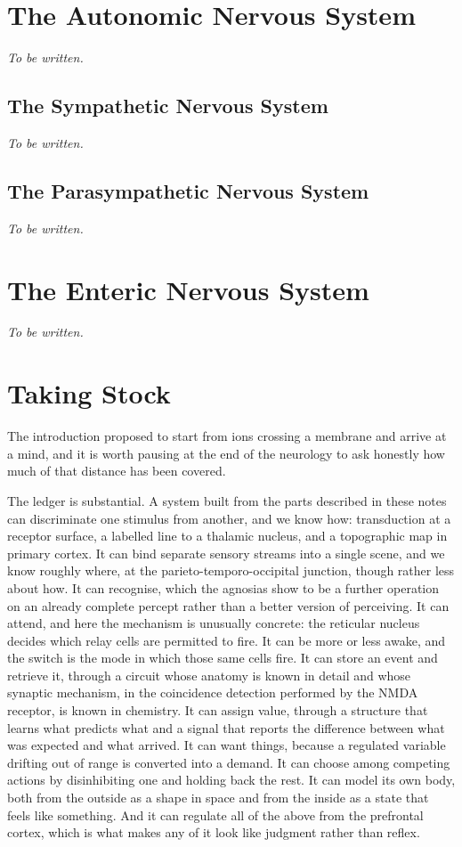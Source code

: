 \documentclass[11pt]{article}
\newcommand{\tobewritten}{\noindent\textit{To be written.}}
\begin{document}
\section{The Autonomic Nervous System}

\tobewritten

\subsection{The Sympathetic Nervous System}

\tobewritten

\subsection{The Parasympathetic Nervous System}

\tobewritten


\section{The Enteric Nervous System}

\tobewritten


\section*{Taking Stock}

The introduction proposed to start from ions crossing a membrane and arrive at a mind, and it is worth pausing at the end of the neurology to ask honestly how much of that distance has been covered.

The ledger is substantial. A system built from the parts described in these notes can discriminate one stimulus from another, and we know how: transduction at a receptor surface, a labelled line to a thalamic nucleus, and a topographic map in primary cortex. It can bind separate sensory streams into a single scene, and we know roughly where, at the parieto-temporo-occipital junction, though rather less about how. It can recognise, which the agnosias show to be a further operation on an already complete percept rather than a better version of perceiving. It can attend, and here the mechanism is unusually concrete: the reticular nucleus decides which relay cells are permitted to fire. It can be more or less awake, and the switch is the mode in which those same cells fire. It can store an event and retrieve it, through a circuit whose anatomy is known in detail and whose synaptic mechanism, in the coincidence detection performed by the NMDA receptor, is known in chemistry. It can assign value, through a structure that learns what predicts what and a signal that reports the difference between what was expected and what arrived. It can want things, because a regulated variable drifting out of range is converted into a demand. It can choose among competing actions by disinhibiting one and holding back the rest. It can model its own body, both from the outside as a shape in space and from the inside as a state that feels like something. And it can regulate all of the above from the prefrontal cortex, which is what makes any of it look like judgment rather than reflex.
\end{document}
